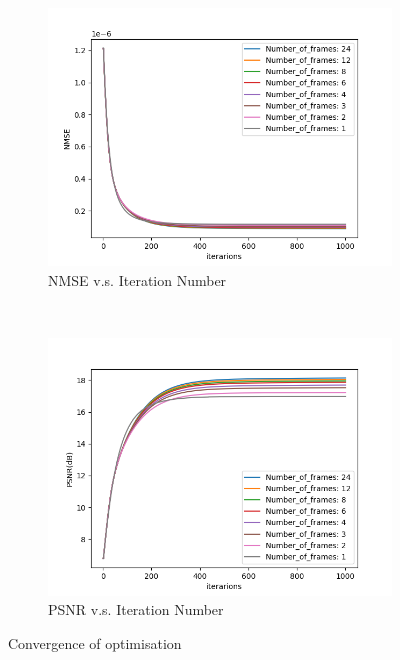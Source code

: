 	\begin{figure}[h!t]
		\begin{subfigure}[t]{0.5\textwidth}
			\centering
			\includegraphics[width=1.0\textwidth]{Mandrill_NMSE_vs_iter.png}
			\caption{NMSE v.s. Iteration Number}
			\label{fig:Mandrill_NMSE_vs_iter}
		\end{subfigure}
		~
		\begin{subfigure}[t]{0.5\textwidth}
			\centering
			\includegraphics[width=1.0\textwidth]{Mandrill_PSNR_vs_iter.png}
			\caption{PSNR v.s. Iteration Number}
			\label{fig:Mandrill_PSNR_vs_iter}
		\end{subfigure}
		\caption{Convergence of optimisation}
		\label{fig:Convergence of optimisation}
	\end{figure}

